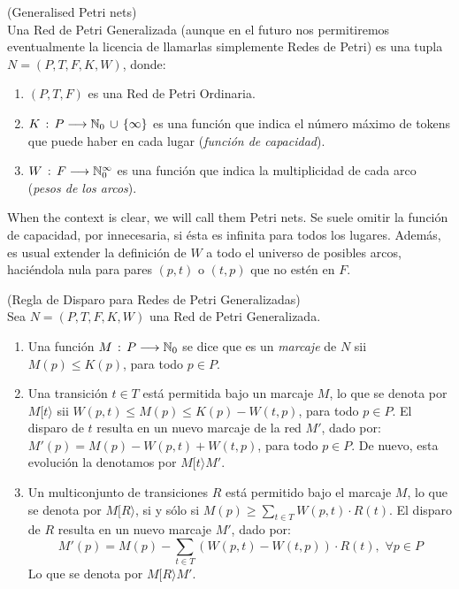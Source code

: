\begin{definition} (Generalised Petri nets)\\
Una Red de Petri Generalizada (aunque en el futuro nos permitiremos
eventualmente la licencia de llamarlas simplemente Redes de Petri)
es una tupla $N=(P,T,F,K,W)$, donde:
\begin{enumerate}
\item $(P,T,F)$ es una Red de Petri Ordinaria.
\item $K\,:\,P \longrightarrow \mathbb{N}_{0} \,\cup\, \{\infty\}$ es una
funci\'{o}n que indica el n\'{u}mero m\'{a}ximo de tokens que puede haber en
cada lugar ({\it funci\'{o}n de capacidad}).
\item $W\,:\,F \longrightarrow \mathbb{N}_{0}^{\infty}$ es una funci\'{o}n que
indica la multiplicidad de cada arco ({\it pesos de los arcos}).
\end{enumerate}
When the context is clear, we will call them Petri nets.
Se suele omitir la funci\'{o}n de capacidad, por innecesaria,
si \'{e}sta es infinita para todos los lugares. Adem\'{a}s, es
usual extender la definici\'{o}n de $W$ a todo el universo de
posibles arcos, haci\'{e}ndola nula para pares
$(p,t)$ o $(t,p)$ que no est\'{e}n en $F$.
\end{definition}

\begin{definition} (Regla de Disparo para Redes de Petri Generalizadas)\\
Sea $N=(P,T,F,K,W)$ una Red de Petri Generalizada.
\begin{enumerate}
\item Una funci\'{o}n $M\,:\, P \longrightarrow \mathbb{N}_{0}$ se dice que
es un {\it marcaje} de $N$ sii $M(p) \leq K(p)$, para todo
$p \in P$.
\item Una transici\'{o}n $t \in T$ est\'{a} permitida bajo un marcaje
$M$, lo que se denota por $M[ t \rangle$
sii $W(p,t) \leq M(p) \leq K(p) - W(t,p)$, para todo $p \in P$.
El disparo de $t$ resulta en un nuevo marcaje de la red $M'$, dado por:
$M'(p) = M(p) - W(p,t) + W(t,p)$, para todo $p \in P$.
De nuevo, esta evoluci\'{o}n la denotamos por $M[ t \rangle M'$.
\item Un multiconjunto de transiciones $R$ est\'{a} permitido bajo el
marcaje $M$, lo que se denota por $M [ R \rangle$, si y s\'{o}lo si
$M(p) \geq \sum_{t \in T} W(p,t) \cdot R(t)$. El disparo de $R$
resulta en un nuevo marcaje $M'$, dado por:
\[ M'(p) = M(p) - \sum_{t \in T} (W(p,t) - W(t,p)) \cdot R(t), \,\,
\forall p \in P\]
Lo que se denota por $M [ R \rangle M'$.
\end{enumerate}
\end{definition}

